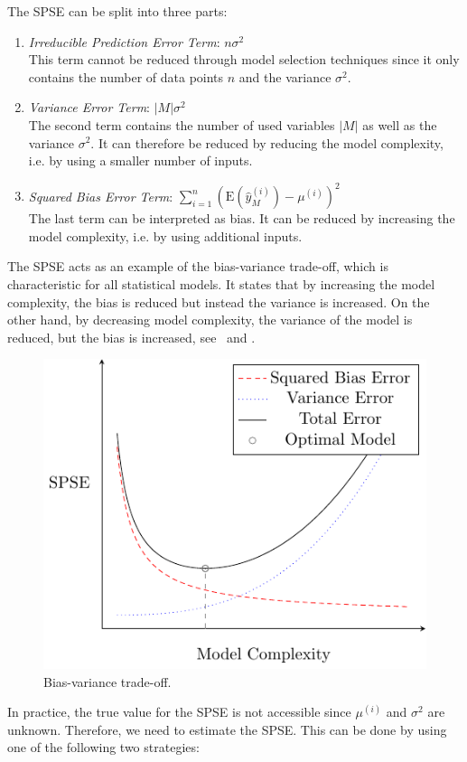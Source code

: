 The SPSE can be split into three parts:

\begin{enumerate}
	\item \emph{Irreducible Prediction Error Term}: $n\sigma^2$ \\
	This term cannot be reduced through model selection techniques since it only contains the number of data points $n$ and the variance $\sigma^2$.

	\item \emph{Variance Error Term}: $\vert M \vert \sigma^2$ \\
	The second term contains the number of used variables $\vert M \vert$ as well as the variance $\sigma^2$. It can therefore be reduced by reducing the model complexity, i.e. by using a smaller number of inputs.
	
	\item \emph{Squared Bias Error Term}: $\sum_{i=1}^{n} \left( \text{E}(\hat y^{(i)}_M) - \mu^{(i)} \right)^2$\\
	The last term can be interpreted as bias. It can be reduced by increasing the model complexity, i.e. by using additional inputs.
\end{enumerate}
%
The SPSE acts as an example of the bias-variance trade-off, which is characteristic for all statistical models. It states that by increasing the model complexity, the bias is reduced but instead the variance is increased. On the other hand, by decreasing model complexity, the variance of the model is reduced, but the bias is increased, see~ and \cite{bishop2006patternRecognition}.

\begin{figure}[H]
	\centering
	\includegraphics{graphics/pgfplots/cha2/bvd.pdf}
	\caption{Bias-variance trade-off.}
	\label{fig:bv-trade-off}
\end{figure}
%
In practice, the true value for the SPSE is not accessible since $\mu^{(i)}$ and $\sigma^2$ are unknown. Therefore, we need to estimate the SPSE. This can be done by using one of the following two strategies:

